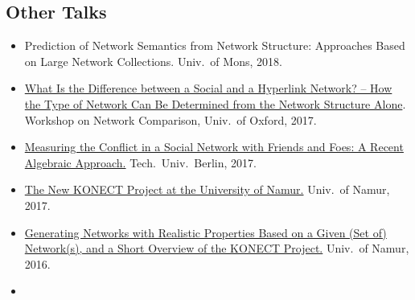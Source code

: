 \documentclass[line,mm]{res}
\newcounter{x}
\newcounter{y}
\newcommand{\talknumber}{T\arabic{y}\stepcounter{y}}
\newcounter{z}
\begin{document}
\begin{resume}
\section{Other Talks}
\begin{itemize}
  \item[{[\talknumber]}]
    Prediction of Network Semantics from Network Structure: Approaches
    Based on Large Network Collections.  Univ.\ of Mons, 2018. 
  \item[{[\talknumber]}]
    \href{https://www.slideshare.net/kunegis/title-what-is-the-difference-between-a-social-and-a-hyperlink-network-how-the-type-of-network-can-be-determined-from-the-network-structure-alone}{What Is the Difference between a Social and a Hyperlink Network?
    -- How the Type of Network Can Be Determined from the Network Structure
    Alone}. Workshop on Network Comparison, 
    Univ.\ of Oxford, 2017.   
  \item[{[\talknumber]}]
    \href{https://www.slideshare.net/kunegis/measuring-the-conflict-in-a-social-network-with-friends-and-foes-a-recent-algebraic-approach}{Measuring the Conflict in a Social Network with Friends and Foes:  A
    Recent Algebraic Approach.}
    Tech.\ Univ.\ Berlin, 2017. 
  \item[{[\talknumber]}] 
    \href{https://github.com/kunegis/pdfs/blob/master/kunegis:konect-namur.presentation.pdf}{The
      New KONECT Project at the University of Namur.}
    Univ.\ of Namur, 2017. 
  \item[{[\talknumber]}] 
    \href{https://github.com/kunegis/pdfs/blob/master/kunegis:graph-generator-namur.presentation.pdf}{Generating
      Networks with Realistic Properties Based on a 
    Given (Set of) Network(s), and a Short Overview of the KONECT
    Project.}  Univ.\ of Namur, 2016. 
  \item[{[\talknumber]}]
\end{itemize}
\end{resume}
\end{document}
